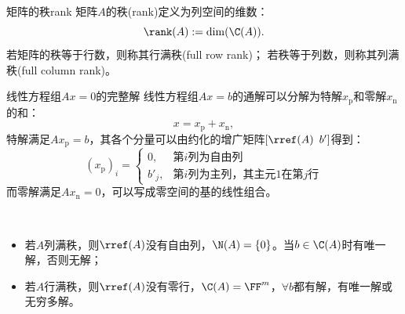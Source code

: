 \begin{definition}{矩阵的秩}{rank}
	矩阵$A$的秩(rank)定义为列空间的维数：%
	\[
		\rank(A):=\dim(\C(A)).
	\]
	若矩阵的秩等于行数，则称其行满秩(full row rank)；
	若秩等于列数，则称其列满秩(full column rank)。
\end{definition}
\begin{theorem}
	{线性方程组$Ax=0$的完整解}{}
	线性方程组$Ax=b$的通解可以分解为特解$x_{\mathrm p}$和零解$x_{\mathrm n}$的和：
	\[
		x=x_{\mathrm p}+x_{\mathrm n},
	\]
	特解满足$Ax_{\mathrm p}=b$，其各个分量可以由约化的增广矩阵$[\rref(A)\enspace b']$得到：
	\[
		(x_{\mathrm p})_i=\begin{cases}
			0,&\text{第$i$列为自由列}\\
			b'_j,&\text{第$i$列为主列，其主元1在第$j$行}
		\end{cases}
	\]
	而零解满足$Ax_{\mathrm n}=0$，可以写成零空间的基的线性组合。
\end{theorem}
\begin{corollary}
	~
	\begin{itemize}
		\item 若$A$列满秩，则$\rref(A)$没有自由列，$\N(A)=\{0\}$。当$b\in\C(A)$时有唯一解，否则无解；
		\item 若$A$行满秩，则$\rref(A)$没有零行，$\C(A)=\FF^m$，$\forall b$都有解，有唯一解或无穷多解。
	\end{itemize}
\end{corollary}
